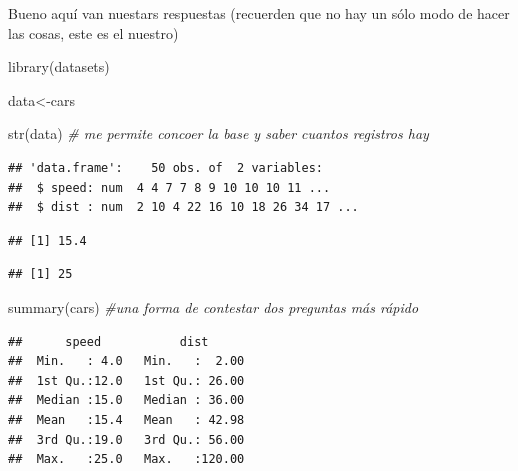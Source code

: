 \documentclass[
]{book}
\newenvironment{Shaded}{\begin{snugshade}}{\end{snugshade}}
\newcommand{\CommentTok}[1]{\textcolor[rgb]{0.56,0.35,0.01}{\textit{#1}}}
\newcommand{\FunctionTok}[1]{\textcolor[rgb]{0.00,0.00,0.00}{#1}}
\newcommand{\NormalTok}[1]{#1}
\newcommand{\OtherTok}[1]{\textcolor[rgb]{0.56,0.35,0.01}{#1}}
\newcommand{\SpecialCharTok}[1]{\textcolor[rgb]{0.00,0.00,0.00}{#1}}
\begin{document}
Bueno aquí van nuestars respuestas (recuerden que no hay un sólo modo de hacer las cosas, este es el nuestro)

\begin{Shaded}
\begin{Highlighting}[]
\FunctionTok{library}\NormalTok{(datasets)}

\NormalTok{data}\OtherTok{\textless{}{-}}\NormalTok{cars}

\FunctionTok{str}\NormalTok{(data) }\CommentTok{\# me permite concoer la base y saber cuantos registros hay}
\end{Highlighting}
\end{Shaded}

\begin{verbatim}
## 'data.frame':    50 obs. of  2 variables:
##  $ speed: num  4 4 7 7 8 9 10 10 10 11 ...
##  $ dist : num  2 10 4 22 16 10 18 26 34 17 ...
\end{verbatim}

\begin{Shaded}
\end{Shaded}

\begin{verbatim}
## [1] 15.4
\end{verbatim}

\begin{Shaded}
\end{Shaded}

\begin{verbatim}
## [1] 25
\end{verbatim}

\begin{Shaded}
\begin{Highlighting}[]
\FunctionTok{summary}\NormalTok{(cars) }\CommentTok{\#una forma de contestar dos preguntas más rápido}
\end{Highlighting}
\end{Shaded}

\begin{verbatim}
##      speed           dist       
##  Min.   : 4.0   Min.   :  2.00  
##  1st Qu.:12.0   1st Qu.: 26.00  
##  Median :15.0   Median : 36.00  
##  Mean   :15.4   Mean   : 42.98  
##  3rd Qu.:19.0   3rd Qu.: 56.00  
##  Max.   :25.0   Max.   :120.00
\end{verbatim}
\end{document}
